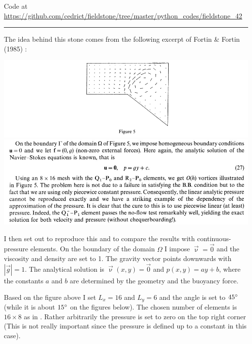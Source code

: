 

\begin{center}
Code at \url{https://github.com/cedrict/fieldstone/tree/master/python_codes/fieldstone_42}
\end{center}

\par\noindent\rule{\textwidth}{0.4pt}



The idea behind this stone comes from the following excerpt of Fortin \& Fortin (1985) \cite{fofo85}:
\begin{center}
\includegraphics[width=14cm]{python_codes/fieldstone_42/images/fofo85a}\\
\includegraphics[width=14cm]{python_codes/fieldstone_42/images/fofo85b}
\end{center}

I then set out to reproduce this and to compare the results with continuous-pressure elements.
On the boundary of the domain $\Omega$ I impose $\vec\upnu=\vec{0}$ and 
the viscosity and density are set to 1. The gravity vector points downwards
with $|\vec{g}|=1$.
The analytical solution is $\vec\upnu(x,y)=\vec{0}$ and $p(x,y)=ay+b$, 
where the constants $a$ and $b$ are determined by the geometry and the buoyancy force.

Based on the figure above I set $L_x=16$ and $L_y=6$ and the angle is set to $45\degree$ (while it 
is about $15\degree$ on the figures below).
The chosen number of elements is $16\times 8$ as in \cite{fofo85}.
Rather arbitrarily the pressure is set to zero on the top right corner (This is not really
important since the pressure is defined up to a constant in this case).


